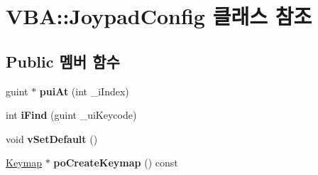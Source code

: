 \hypertarget{class_v_b_a_1_1_joypad_config}{}\section{V\+BA\+:\+:Joypad\+Config 클래스 참조}
\label{class_v_b_a_1_1_joypad_config}
\subsection*{Public 멤버 함수}
\begin{DoxyCompactItemize}
\item 
\mbox{\label{class_v_b_a_1_1_joypad_config_afa304227fa214176c874619365ffc445}} 
guint $\ast$ {\bfseries pui\+At} (int \+\_\+i\+Index)
\item 
\mbox{\label{class_v_b_a_1_1_joypad_config_a27d56b77293ce938b1a6437a384d625d}} 
int {\bfseries i\+Find} (guint \+\_\+ui\+Keycode)
\item 
\mbox{\label{class_v_b_a_1_1_joypad_config_af9f282b555d910519ce2fa03d5c66dda}} 
void {\bfseries v\+Set\+Default} ()
\item 
\mbox{\label{class_v_b_a_1_1_joypad_config_a959ba3641c366cf9acae6bf03990fcfb}} 
\mbox{\hyperlink{class_v_b_a_1_1_keymap}{Keymap}} $\ast$ {\bfseries po\+Create\+Keymap} () const
\end{DoxyCompactItemize}
